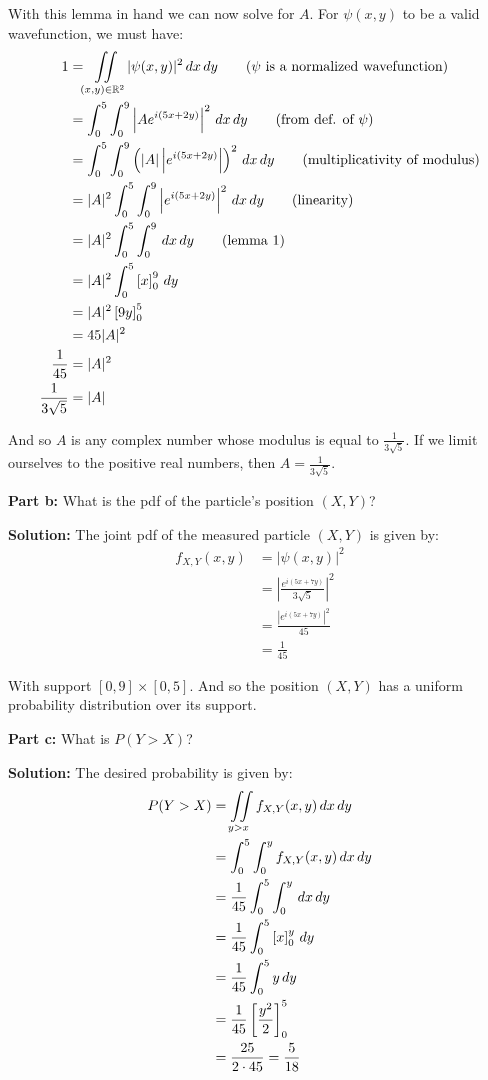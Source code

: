 \documentclass{article}
\renewcommand{\eval}[3]{\left[#1\right]_{#2}^{#3}}
\begin{document}
With this lemma in hand we can now solve for $A$. For $\psi(x,y)$ to be a valid wavefunction, we must have:
\begin{align*}
    1&=\iint\displaylimits_{(x,y)\in\mathbb R^2}|\psi(x,y)|^2\,dx\,dy\tag{$\psi$ is a normalized wavefunction}\\
    &=\int_0^5\int_0^9\left|Ae^{i(5x+2y)}\right|^2\,dx\,dy\tag{from def. of $\psi$}\\
    &=\int_0^5\int_0^9\left(|A|\left|e^{i(5x+2y)}\right|\right)^2\,dx\,dy\tag{multiplicativity of modulus}\\
    &=|A|^2\int_0^5\int_0^9\left|e^{i(5x+2y)}\right|^2\,dx\,dy\tag{linearity}\\
    &=|A|^2\int_0^5\int_0^9\,dx\,dy\tag{lemma 1}\\
    &=|A|^2\int_0^5\eval{x}{0}{9}\,dy\\
    &=|A|^2\eval{9y}{0}{5}\\
    &=45|A|^2\\
    \frac{1}{45}&=|A|^2\\
    \frac{1}{3\sqrt{5}}&=|A|
\end{align*}

And so $A$ is any complex number whose modulus is equal to $\frac{1}{3\sqrt{5}}$. If we limit ourselves to the positive real numbers, then $A=\frac{1}{3\sqrt{5}}$.
\bigskip

\noindent\textbf{Part b:} What is the pdf of the particle's position $(X,Y)$?
\bigskip

\noindent\textbf{Solution:} The joint pdf of the measured particle $(X,Y)$ is given by:
\begin{align*}
    f_{X,Y}(x,y)&=|\psi(x,y)|^2\\
    &=\left|\frac{e^{i(5x+7y)}}{3\sqrt{5}}\right|^2\\
    &=\frac{\left|e^{i(5x+7y)}\right|^2}{45}\\
    &=\frac{1}{45}\tag{lemma 1}
\end{align*}

With support $[0,9]\times[0,5]$. And so the position $(X,Y)$ has a uniform probability distribution over its support.
\bigskip
\newpage

\noindent\textbf{Part c:} What is $P(Y>X)$?
\bigskip

\noindent\textbf{Solution:} The desired probability is given by:
\begin{align*}
    P(Y>X)&=\iint\displaylimits_{y>x}f_{X,Y}(x,y)\,dx\,dy\\
    &=\int_0^5\int_0^yf_{X,Y}(x,y)\,dx\,dy\\
    &=\frac{1}{45}\int_0^5\int_0^y\,dx\,dy\\
    &=\frac{1}{45}\int_0^5\eval{x}{0}{y}\,dy\\
    &=\frac{1}{45}\int_0^5y\,dy\\
    &=\frac{1}{45}\eval{\frac{y^2}{2}}{0}{5}\\
    &=\frac{25}{2\cdot45}=\frac{5}{18}
\end{align*}
\bigskip
\end{document}
